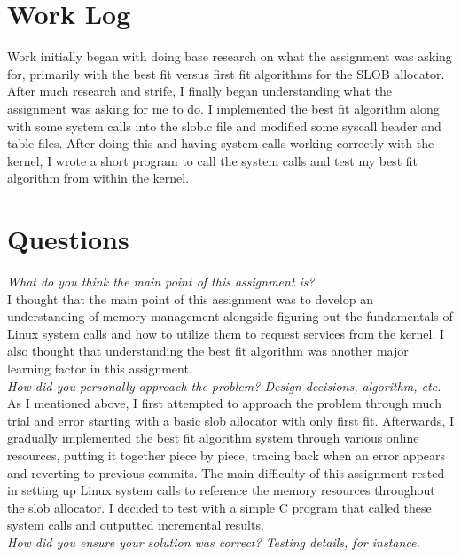 \documentclass[letterpaper,10pt,titlepage]{article}
\begin{document}
\newpage

\section{Work Log}

Work initially began with doing base research on what the assignment was asking for, primarily with the best fit versus first fit algorithms for the SLOB allocator. After much research and strife, I finally began understanding what the assignment was asking for me to do. I implemented the best fit algorithm along with some system calls into the slob.c file and modified some syscall header and table files. After doing this and having system calls working correctly with the kernel, I wrote a short program to call the system calls and test my best fit algorithm from within the kernel.\\

\section{Questions}

\textit{What do you think the main point of this assignment is?}\\

I thought that the main point of this assignment was to develop an understanding of memory management alongside figuring out the fundamentals of Linux system calls and how to utilize them to request services from the kernel. I also thought that understanding the best fit algorithm was another major learning factor in this assignment.\\

\textit{How did you personally approach the problem? Design decisions, algorithm, etc.}\\

As I mentioned above, I first attempted to approach the problem through much trial and error starting with a basic slob allocator with only first fit.  Afterwards, I gradually implemented the best fit algorithm system through various online resources, putting it together piece by piece, tracing back when an error appears and reverting to previous commits. The main difficulty of this assignment rested in setting up Linux system calls to reference the memory resources throughout the slob allocator. I decided to test with a simple C program that called these system calls and outputted incremental results.\\

\textit{How did you ensure your solution was correct? Testing details, for instance.}\\
\end{document}
